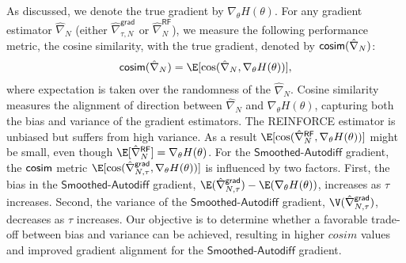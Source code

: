 As discussed, we denote the true gradient by $\nabla_{\theta}H(\theta)$.  For any gradient estimator $\hat{\nabla}_N $ (either $\hat{\nabla}_{\tau,N}^{\mathsf{grad}}$ or $\hat{\nabla}_N^{\mathsf{RF}}$), we measure the following performance metric, the cosine similarity, with the true gradient, denoted by $\mathsf{cosim}(\hat{\nabla}_N)$:
\begin{align*}
\cosim(\hat{\nabla}_N) = \E[\cos(\hat{\nabla}_N, \nabla_{\theta}H(\theta))],
\end{align*}
where expectation is taken over the randomness of the $\hat{\nabla}_N$.
Cosine similarity measures the alignment of direction between $\hat{\nabla}_N$ and $\nabla_{\theta}H(\theta)$, capturing both the bias and variance of the gradient estimators. 
The \textsf{REINFORCE} estimator is unbiased but suffers from high variance. As a result 
$\E [\cos(\hat{\nabla}_N^{\mathsf{RF}}, \nabla_{\theta}H(\theta))]$ might be small, even though $\E[\hat{\nabla}_N^{\mathsf{RF}}]= \nabla_{\theta} H(\theta)$.  
For the  $\mathsf{Smoothed\text{-}Autodiff}$  gradient, the $\mathsf{cosim}$ metric $\E [\cos(\hat{\nabla}_{N,\tau}^{\mathsf{grad}}, \nabla_{\theta}H(\theta))]$ is influenced by two factors. First, the  bias in the $\mathsf{Smoothed\text{-}Autodiff}$ gradient,  $\E (\hat{\nabla}_{N,\tau}^{\mathsf{grad}}) - \E (\nabla_{\theta}H(\theta))$, increases as $\tau$ increases. 
Second, the variance of the $\mathsf{Smoothed\text{-}Autodiff}$ gradient, $\V(\hat{\nabla}_{N,\tau}^{\mathsf{grad}})$,  decreases as $\tau$ increases. Our objective is to determine whether a favorable trade-off between bias and variance can be achieved, resulting in higher $cosim$ values and improved gradient alignment for the $\mathsf{Smoothed\text{-}Autodiff}$ gradient.













